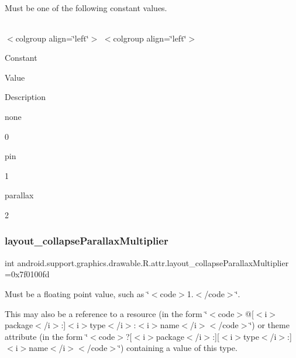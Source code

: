 Must be one of the following constant values.

\tabulinesep=1mm
\begin{longtabu} spread 0pt [c]{*{0}{|X[-1]}|}
\hline
\end{longtabu}
$<$colgroup align=\char`\"{}left\char`\"{}$>$ $<$colgroup align=\char`\"{}left\char`\"{}$>$ 

Constant

Value

Description 

{\ttfamily none}

0

{\ttfamily pin}

1

{\ttfamily parallax}

2\mbox{\label{classandroid_1_1support_1_1graphics_1_1drawable_1_1R_1_1attr_a596115382c5316fa019df21524b620d2}} 
\subsubsection{\texorpdfstring{layout\+\_\+collapse\+Parallax\+Multiplier}{layout\_collapseParallaxMultiplier}}
{\footnotesize\ttfamily int android.\+support.\+graphics.\+drawable.\+R.\+attr.\+layout\+\_\+collapse\+Parallax\+Multiplier =0x7f0100fd\hspace{0.3cm}{\ttfamily [static]}}

Must be a floating point value, such as \char`\"{}$<$code$>$1.$<$/code$>$\char`\"{}. 

This may also be a reference to a resource (in the form \char`\"{}$<$code$>$@\mbox{[}$<$i$>$package$<$/i$>$\+:\mbox{]}$<$i$>$type$<$/i$>$\+:$<$i$>$name$<$/i$>$$<$/code$>$\char`\"{}) or theme attribute (in the form \char`\"{}$<$code$>$?\mbox{[}$<$i$>$package$<$/i$>$\+:\mbox{]}\mbox{[}$<$i$>$type$<$/i$>$\+:\mbox{]}$<$i$>$name$<$/i$>$$<$/code$>$\char`\"{}) containing a value of this type. \mbox{\label{classandroid_1_1support_1_1graphics_1_1drawable_1_1R_1_1attr_a048d44a3f0aba3bf77f3bcf86348f3d0}} 
